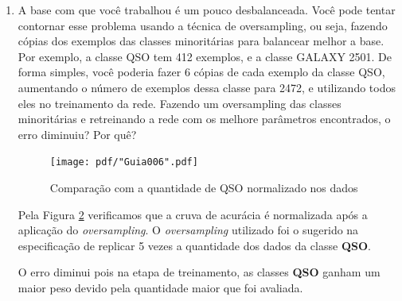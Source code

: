 \begin{enumerate}
    Como os dados são embaralhados na leitura do \textit{dataset}, é possível que a maior os dados da classe \textit{QSO} não estejam na partição de treinamento, ocasionando um erro na avaliação da classe de que não foi treinada.
    
    Se o \textit{overfitting} for causado pela rede, uma possível alternativa é a \textbf{Dropout Regularizattion}\cite{srivastava2014dropout}, em que durante o processo de treinamento, uma certa quantidade de neurônios são selecionados para serem desativados. Assim a rede fica mais robusta e evita o \textit{overfitting} ao mesmo tempo.
    
    A função está disponível na biblioteca padrão do Keras\footnote{\url{https://keras.io/layers/core/#dropout}}.
    
    \begin{figure}[H]
        \centering
        \texttt{[image: pdf/"Guia006".pdf]}
        \caption{Comparação utilizando Dropout Regularization}
        \label{fig:compdropout}
    \end{figure}
    
    Analisando este recurso na Figura \ref{fig:compdropout}, vemos que a acurácia da validação e do teste teve um bom ganho em que muitos casos tem a curva acima do valor de treinamento.
    
    \newpage
    \item A base com que você trabalhou é um pouco desbalanceada. Você pode tentar contornar esse problema usando a técnica de oversampling, ou seja, fazendo cópias dos exemplos das classes minoritárias para balancear melhor a base. Por exemplo, a classe QSO tem 412 exemplos, e a classe GALAXY 2501. De forma simples, você poderia fazer 6 cópias de cada exemplo da classe QSO, aumentando o número de exemplos dessa classe para 2472, e utilizando todos eles no treinamento da rede. Fazendo um oversampling das classes minoritárias e retreinando a rede com os melhore parâmetros encontrados, o erro diminuiu? Por quê?
    
    \begin{figure}[H]
        \centering
        \texttt{[image: pdf/"Guia006".pdf]}
        \caption{Comparação com a quantidade de QSO normalizado nos dados}
        \label{fig:compquantQSO}
    \end{figure}
    
    Pela Figura \ref{fig:compquantQSO} verificamos que a cruva de acurácia é normalizada após a aplicação do \textit{oversampling}.
    O \textit{oversampling} utilizado foi o sugerido na especificação de replicar 5 vezes a quantidade dos dados da classe \textbf{QSO}.
    
    O erro diminui pois na etapa de treinamento, as classes \textbf{QSO} ganham um maior peso devido pela quantidade maior que foi avaliada.
    
    \newpage
\end{enumerate}



